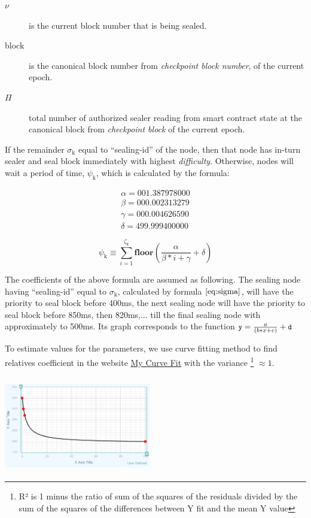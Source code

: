 \documentclass[12pt,oneside]{amsart}
\begin{document}
\begin{multicols}{2}
\begin{description}
\item[$\nu$] is the current block number that is being sealed.
\item[block] is the canonical block number from \textit{checkpoint block number}, of the current epoch.
\item[$\Pi$] total number of authorized sealer reading from smart contract state at the canonical block from \textit{checkpoint block} of the current epoch.
\end{description}

If the remainder $\sigma_{\mathrm{k}}$ equal to ``sealing-id'' of the node, then that node has in-turn sealer and seal block immediately with highest \textit{difficulty}. Otherwise, nodes will wait a period of time, $\psi_{\mathrm{k}}$, which is calculated by the formula:

\begin{eqnarray}
\alpha = 001.387978000 \\
\beta = 000.002313279 \\
\gamma = 000.004626590 \\
\delta = 499.999400000
\end{eqnarray}

\begin{equation}\label{eq:psi}
\psi_{\mathrm{k}} \equiv \sum_{i=1}^{\zeta_\mathrm{k}} \mathbf{floor}(\frac{\alpha}{\beta*i+\gamma} + \delta)
\end{equation}

The coefficients of the above formula are assumed as following. The sealing node having ``sealing-id'' equal to $\sigma_{\mathrm{k}}$, calculated by formula $\eqref{eq:sigma}$, will have the priority to seal block before 400ms, the next sealing node will have the priority to seal block before 850ms, then 820ms,... till the final sealing node with approximately to 500ms. Its graph corresponds to the function $\texttt{\small y} = \frac{a} {(b * x + c)} + \texttt{\small d}$

To estimate values for the parameters, we use curve fitting method to find relatives coefficient in the website \href{https://mycurvefit.com/}{My Curve Fit} with the variance \footnote{R² is 1 minus the ratio of sum of the squares of the residuals divided by the sum of the squares of the differences between Y fit and the mean Y value} $\approx 1$.
\\
\\
\includegraphics[width=0.48\textwidth, height=4cm]{curve-fit}
\\


\end{multicols}
\end{document}
